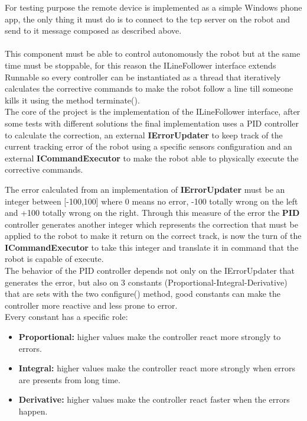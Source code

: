 \documentclass{llncs}
\begin{document}
For testing purpose the remote device is implemented as a simple Windows phone app, the only thing it must do is to connect to the tcp server on the robot and send to it message composed as described above.\\

\\
This component must be able to control autonomously the robot but at the same time must be stoppable, for this reason the ILineFollower interface extends Runnable so every controller can be instantiated as a thread that iteratively calculates the corrective commands to make the robot follow a line till someone kills it using the method terminate().\\
The core of the project is the implementation of the ILineFollower interface, after some tests with different solutions the final implementation uses a PID controller to calculate the correction, an external \textbf{IErrorUpdater} to keep track of the current tracking error of the robot using a specific sensors configuration and an external \textbf{ICommandExecutor} to make the robot able to physically execute the corrective commands.  \\
\begin{center}
\end{center}

\noindent The error calculated from an implementation of \textbf{IErrorUpdater} must be an integer between [-100,100] where 0 means no error, -100 totally wrong on the left and +100 totally wrong on the right. Through this measure of the error the \textbf{PID} controller generates another integer which represents the correction that must be applied to the robot to make it return on the correct track, is now the turn of the \textbf{ICommandExecutor} to take this integer and translate it in command that the robot is capable of execute.\\
The behavior of the PID controller depends not only on the IErrorUpdater that generates the error, but also on 3 constants (Proportional-Integral-Derivative) that are sets with the two configure() method, good constants can make the controller more reactive and less prone to error.\\
Every constant has a specific role:
\begin{itemize}
	\item \textbf{Proportional: } higher values make the controller react more strongly to errors.
	\item \textbf{Integral: } higher values make the controller react  more strongly when errors are presents from long time.
	\item \textbf{Derivative: } higher values make the controller react faster when the errors happen.
\end{itemize}
\end{document}
